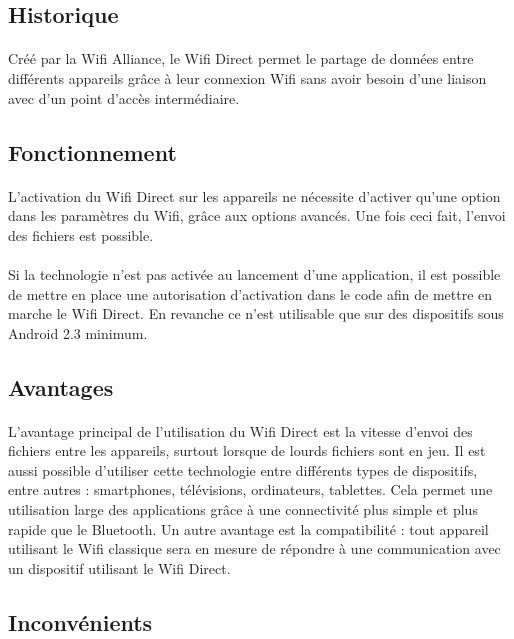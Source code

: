 \documentclass[a4paper,10pt]{report}
\begin{document}
    \subsection{Historique}
      \paragraph{}
      Créé par la Wifi Alliance, le Wifi Direct permet le partage de données entre différents appareils grâce à leur connexion Wifi sans avoir besoin d'une liaison avec d'un point d'accès intermédiaire.
    \subsection{Fonctionnement}
     \paragraph{}
    L'activation du Wifi Direct sur les appareils ne nécessite d'activer qu'une option dans les paramètres du Wifi, grâce aux options avancés. Une fois ceci fait, l'envoi des fichiers est possible.
    \paragraph{}
    Si la technologie n'est pas activée au lancement d'une application, il est possible de mettre en place une autorisation d'activation dans le code afin de mettre en marche le Wifi Direct. En revanche ce n'est utilisable que sur des dispositifs sous Android 2.3 minimum.
    \subsection{Avantages}
     \paragraph{}
     L'avantage principal de l'utilisation du Wifi Direct est la vitesse d'envoi des fichiers entre les appareils, surtout lorsque de lourds fichiers sont en jeu. 
     Il est aussi possible d'utiliser cette technologie entre différents types de dispositifs, entre autres : smartphones, télévisions, ordinateurs, tablettes. Cela permet une utilisation large des applications grâce à une connectivité plus simple et plus rapide que le Bluetooth. Un autre avantage est la compatibilité : tout appareil utilisant le Wifi classique sera en mesure de répondre à une communication avec un dispositif utilisant le Wifi Direct.
    \subsection{Inconvénients}
\end{document}
